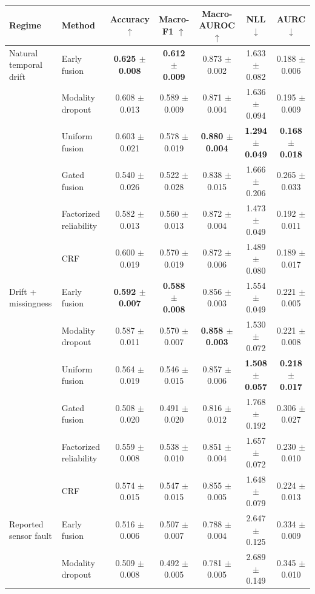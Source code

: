\begin{tabular}{llccccc}
\toprule
Regime & Method & Accuracy $\uparrow$ & Macro-F1 $\uparrow$ & Macro-AUROC $\uparrow$ & NLL $\downarrow$ & AURC $\downarrow$ \\
\midrule
Natural temporal drift & Early fusion & \textbf{0.625 $\pm$ 0.008} & \textbf{0.612 $\pm$ 0.009} & 0.873 $\pm$ 0.002 & 1.633 $\pm$ 0.082 & 0.188 $\pm$ 0.006 \\
 & Modality dropout & 0.608 $\pm$ 0.013 & 0.589 $\pm$ 0.009 & 0.871 $\pm$ 0.004 & 1.636 $\pm$ 0.094 & 0.195 $\pm$ 0.009 \\
 & Uniform fusion & 0.603 $\pm$ 0.021 & 0.578 $\pm$ 0.019 & \textbf{0.880 $\pm$ 0.004} & \textbf{1.294 $\pm$ 0.049} & \textbf{0.168 $\pm$ 0.018} \\
 & Gated fusion & 0.540 $\pm$ 0.026 & 0.522 $\pm$ 0.028 & 0.838 $\pm$ 0.015 & 1.666 $\pm$ 0.206 & 0.265 $\pm$ 0.033 \\
 & Factorized reliability & 0.582 $\pm$ 0.013 & 0.560 $\pm$ 0.013 & 0.872 $\pm$ 0.004 & 1.473 $\pm$ 0.049 & 0.192 $\pm$ 0.011 \\
 & CRF & 0.600 $\pm$ 0.019 & 0.570 $\pm$ 0.019 & 0.872 $\pm$ 0.006 & 1.489 $\pm$ 0.080 & 0.189 $\pm$ 0.017 \\
\addlinespace
Drift + missingness & Early fusion & \textbf{0.592 $\pm$ 0.007} & \textbf{0.588 $\pm$ 0.008} & 0.856 $\pm$ 0.003 & 1.554 $\pm$ 0.049 & 0.221 $\pm$ 0.005 \\
 & Modality dropout & 0.587 $\pm$ 0.011 & 0.570 $\pm$ 0.007 & \textbf{0.858 $\pm$ 0.003} & 1.530 $\pm$ 0.072 & 0.221 $\pm$ 0.008 \\
 & Uniform fusion & 0.564 $\pm$ 0.019 & 0.546 $\pm$ 0.015 & 0.857 $\pm$ 0.006 & \textbf{1.508 $\pm$ 0.057} & \textbf{0.218 $\pm$ 0.017} \\
 & Gated fusion & 0.508 $\pm$ 0.020 & 0.491 $\pm$ 0.020 & 0.816 $\pm$ 0.012 & 1.768 $\pm$ 0.192 & 0.306 $\pm$ 0.027 \\
 & Factorized reliability & 0.559 $\pm$ 0.008 & 0.538 $\pm$ 0.010 & 0.851 $\pm$ 0.004 & 1.657 $\pm$ 0.072 & 0.230 $\pm$ 0.010 \\
 & CRF & 0.574 $\pm$ 0.015 & 0.547 $\pm$ 0.015 & 0.855 $\pm$ 0.005 & 1.648 $\pm$ 0.079 & 0.224 $\pm$ 0.013 \\
\addlinespace
Reported sensor fault & Early fusion & 0.516 $\pm$ 0.006 & 0.507 $\pm$ 0.007 & 0.788 $\pm$ 0.004 & 2.647 $\pm$ 0.125 & 0.334 $\pm$ 0.009 \\
 & Modality dropout & 0.509 $\pm$ 0.008 & 0.492 $\pm$ 0.005 & 0.781 $\pm$ 0.005 & 2.689 $\pm$ 0.149 & 0.345 $\pm$ 0.010 \\

\end{tabular}
